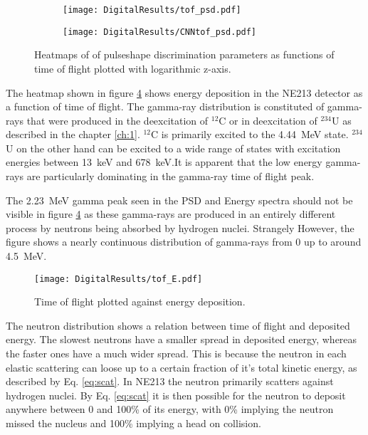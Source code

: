 \documentclass[main.tex]{subfiles}
\begin{document}
\begin{figure}
    \centering
    \begin{subfigure}[ht]{\textwidth}
        \texttt{[image: DigitalResults/tof\_psd.pdf]}
        \caption{}
        \label{fig:tof_digi_cc}
    \end{subfigure}
	\begin{subfigure}[ht]{\textwidth}
        \texttt{[image: DigitalResults/CNNtof\_psd.pdf]}
        \caption{}
        \label{fig:tof_digi_cnn}
    \end{subfigure}
    \caption[Pulse shape parameters as function of time of flight, digital setup.]{Heatmaps of of pulseshape discrimination parameters as functions of time of flight plotted with logarithmic z-axis.}
    \label{fig:tof_cc_tof_cnn}
\end{figure}

The heatmap shown in figure \ref{fig:tof_E_d} shows energy deposition in the NE213 detector as a function of time of flight. The gamma-ray distribution is constituted of gamma-rays that were produced in the deexcitation of $^\mathrm{12}$C or in deexcitation of $^\mathrm{234}$U as described in the chapter \ref{ch:1}. $^\mathrm{12}$C is primarily excited to the \SI{4.44}{\MeV} state. $^\mathrm{234}$U on the other hand can be excited to a wide range of states with excitation energies between \SI{13}{keV} and \SI{678}{keV}\cite{Nudat}.It is apparent that the low energy gamma-rays are particularly dominating in the gamma-ray time of flight peak.

The \SI{2.23}{MeV} gamma peak seen in the PSD and Energy spectra should not be visible in figure \ref{fig:tof_E_d} as these gamma-rays are produced in an entirely different process by neutrons being absorbed by hydrogen nuclei. Strangely However, the figure shows a nearly continuous distribution of gamma-rays from 0 up to around \SI{4.5}{MeV}.

\begin{figure}[ht]
    \centering
        \texttt{[image: DigitalResults/tof\_E.pdf]}
        \caption[Time of flight plotted against energy deposition.]{Time of flight plotted against energy deposition.}
    \label{fig:tof_E_d} 
\end{figure}

The neutron distribution shows a relation between time of flight and deposited energy. The slowest neutrons have a smaller spread in deposited energy, whereas the faster ones have a much wider spread. This is because the neutron in each elastic scattering can loose up to a certain fraction of it's total kinetic energy, as described by Eq. \ref{eq:scat}. In NE213 the neutron primarily scatters against hydrogen nuclei. By Eq. \ref{eq:scat} it is then possible for the neutron to deposit anywhere between 0 and 100\% of its energy, with 0\% implying the neutron missed the nucleus and 100\% implying a head on collision.
\end{document}
